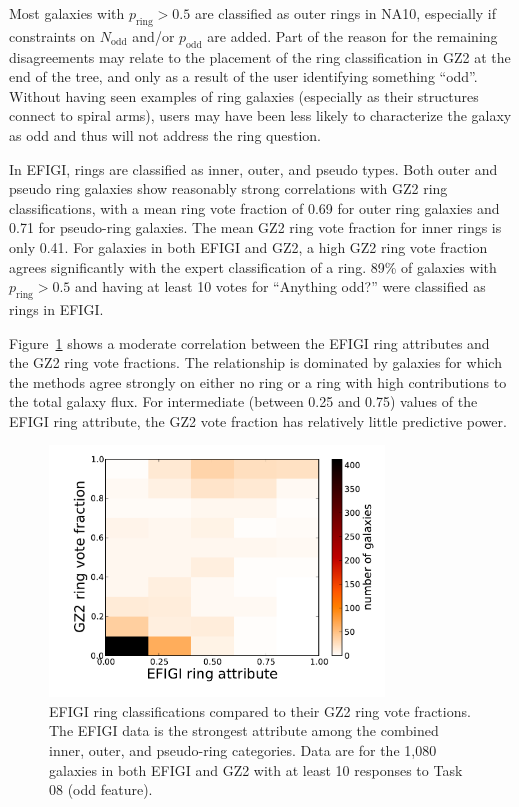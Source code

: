 \documentclass[useAMS,usenatbib]{mn2e}
\begin{document}
Most galaxies with $p_\mathrm{ring}>0.5$ are classified as outer rings in NA10, especially if constraints on $N_\mathrm{odd}$ and/or $p_\mathrm{odd}$ are added. Part of the reason for the remaining disagreements may relate to the placement of the ring classification in GZ2 at the end of the tree, and only as a result of the user identifying something ``odd''. Without having seen examples of ring galaxies (especially as their structures connect to spiral arms), users may have been less likely to characterize the galaxy as odd and thus will not address the ring question. 

In EFIGI, rings are classified as inner, outer, and pseudo types. Both outer and pseudo ring galaxies show reasonably strong correlations with GZ2 ring classifications, with a mean ring vote fraction of 0.69 for outer ring galaxies and 0.71 for pseudo-ring galaxies. The mean GZ2 ring vote fraction for inner rings is only 0.41. For galaxies in both EFIGI and GZ2, a high GZ2 ring vote fraction agrees significantly with the expert classification of a ring. 89\% of galaxies with $p_\mathrm{ring}>0.5$ and having at least 10 votes for ``Anything odd?'' were classified as rings in EFIGI. 

Figure~\ref{fig-efigi_rings} shows a moderate correlation between the EFIGI ring attributes and the GZ2 ring vote fractions. The relationship is dominated by galaxies for which the methods agree strongly on either no ring or a ring with high contributions to the total galaxy flux. For intermediate (between 0.25 and 0.75) values of the EFIGI ring attribute, the GZ2 vote fraction has relatively little predictive power. %

\begin{figure}
\includegraphics[angle=0,width=3.5in]{figures/efigi_rings.pdf}
\caption{EFIGI ring classifications compared to their GZ2 ring vote fractions. The EFIGI data is the strongest attribute among the combined inner, outer, and pseudo-ring categories. Data are for the 1,080 galaxies in both EFIGI and GZ2 with at least 10 responses to Task 08 (odd feature). 
\label{fig-efigi_rings}}
\end{figure}
\end{document}
